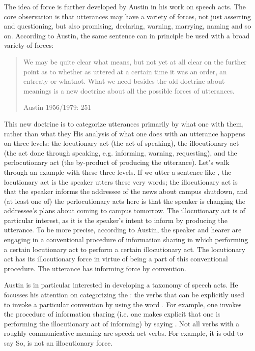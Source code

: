 The idea of force is further developed by Austin in his work on speech acts. The core observation is that utterances may have a variety of forces, not just asserting and questioning, but also promising, declaring, warning, marrying, naming and so on. According to Austin, the same sentence can in principle be used with a broad variety of forces:

\begin{quote}
    
We may be quite clear what  means, but not yet at all clear on the further point as to whether as uttered at a certain time it was an order, an entreaty or whatnot. What we need besides the old doctrine about meanings is a new doctrine about all the possible forces of utterances.

\hfill Austin 1956/1979: 251
\end{quote}

This new doctrine is to categorize utterances primarily by what one  with them, rather than what they  His analysis of what one does with an utterance happens on three levels: the locutionary act (the act of speaking), the illocutionary act (the act done through speaking, e.g. informing, warning, requesting), and the perlocutionary act (the by-product of producing the utterance). Let’s walk through an example with these three levels. If we utter a sentence like , the locutionary act is the speaker utters these very words; the illocutionary act is that the speaker informs the addressee of the news about campus shutdown, and (at least one of) the perlocutionary acts here is that the speaker is changing the addressee’s plans about coming to campus tomorrow. The illocutionary act is of particular interest, as it is the speaker’s intent to inform by producing the utterance. To be more precise, according to Austin, the speaker and hearer are engaging in a conventional procedure of information sharing in which performing a certain locutionary act  to perform a certain illocutionary act. The locutionary act has its illocutionary force in virtue of being a part of this conventional procedure. The utterance has informing force by convention.

Austin is in particular interested in developing a taxonomy of speech acts. He focusses his attention on categorizing the : the verbs that can be explicitly used to invoke a particular convention by using the word . For example, one invokes the procedure of information sharing (i.e. one makes explicit that one is performing the illocutionary act of informing) by saying . Not all verbs with a roughly communicative meaning are speech act verbs. For example, it is odd to say  So,  is not an illocutionary force.

